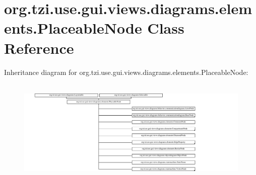 \hypertarget{classorg_1_1tzi_1_1use_1_1gui_1_1views_1_1diagrams_1_1elements_1_1_placeable_node}{\section{org.\-tzi.\-use.\-gui.\-views.\-diagrams.\-elements.\-Placeable\-Node Class Reference}
\label{classorg_1_1tzi_1_1use_1_1gui_1_1views_1_1diagrams_1_1elements_1_1_placeable_node}
}
Inheritance diagram for org.\-tzi.\-use.\-gui.\-views.\-diagrams.\-elements.\-Placeable\-Node\-:\begin{figure}[H]
\begin{center}
\leavevmode
\includegraphics[height=5.067873cm]{classorg_1_1tzi_1_1use_1_1gui_1_1views_1_1diagrams_1_1elements_1_1_placeable_node}
\end{center}
\end{figure}
